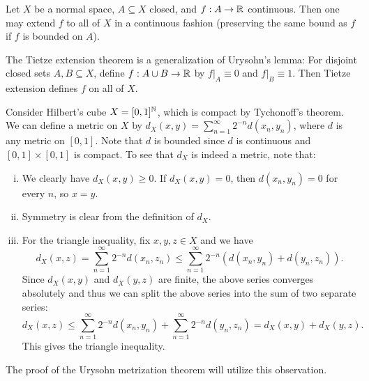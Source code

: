 \begin{theorem}
  Let $X$ be a normal space, $A \subseteq X$
  closed, and $f : A \to \mathbb{R}$ continuous. Then
  one may extend $f$ to all of $X$ in a continuous
  fashion (preserving the same bound as $f$ if $f$ is
  bounded on $A$).
\end{theorem}

\begin{remark}
  The Tietze extension theorem is a generalization
  of Urysohn's lemma: For disjoint closed sets
  $A, B \subseteq X$, define $f : A \cup B \to \mathbb{R}$
  by $f|_A \equiv 0$ and $f|_B \equiv 1$.
  Then Tietze extension defines $f$ on all of $X$.
\end{remark}

\begin{example}
  Consider Hilbert's cube $X = [0, 1]^{\mathbb{N}}$, which
  is compact by Tychonoff's theorem. We can define
  a metric on $X$ by
  $d_X(x, y) = \sum_{n = 1}^\infty 2^{-n} d(x_n, y_n)$,
  where $d$ is any metric on $[0, 1]$. Note that $d$
  is bounded since $d$ is continuous and
  $[0, 1] \times [0, 1]$ is compact. To
  see that $d_X$ is indeed a metric, note that:
  \begin{enumerate}[(i)]
    \item We clearly have $d_X(x, y) \ge 0$.
      If $d_X(x, y) = 0$, then $d(x_n, y_n) = 0$
      for every $n$, so $x = y$.
    \item Symmetry is clear from the definition of
      $d_X$.
    \item For the triangle inequality, fix $x, y, z \in X$ and we have
      \[
        d_X(x, z) = \sum_{n = 1}^\infty 2^{-n} d(x_n, z_n)
        \le \sum_{n = 1}^\infty 2^{-n} (d(x_n, y_n) + d(y_n, z_n)).
      \]
      Since $d_X(x, y)$ and $d_X(y, z)$ are finite,
      the above series converges absolutely and thus
      we can split the above series into the sum of
      two separate series:
      \[
        d_X(x, z) \le \sum_{n = 1}^\infty 2^{-n} d(x_n, y_n) + \sum_{n = 1}^\infty 2^{-n} d(y_n, z_n)
        = d_X(x, y) + d_X(y, z).
      \]
      This gives the triangle inequality.
  \end{enumerate}
  The proof of the Urysohn metrization theorem
  will utilize this observation.
\end{example}
